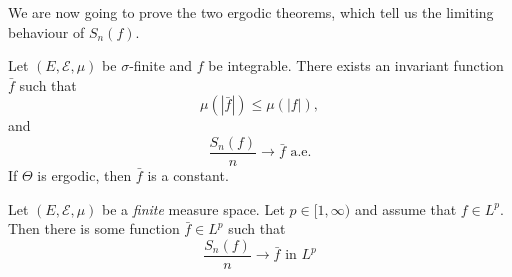 \documentclass[a4paper]{article}
\begin{document}
We are now going to prove the two ergodic theorems, which tell us the limiting behaviour of $S_n(f)$.

\begin{thm}
  Let $(E, \mathcal{E}, \mu)$ be $\sigma$-finite and $f$ be integrable. There exists an invariant function $\bar{f}$ such that
  \[
    \mu(|\bar{f}|) \leq \mu(|f|),
  \]
  and
  \[
    \frac{S_n(f)}{n} \to \bar{f}\text{ a.e.}
  \]
  If $\Theta$ is ergodic, then $\bar{f}$ is a constant.
\end{thm}

\begin{thm}
  Let $(E, \mathcal{E}, \mu)$ be a \emph{finite} measure space. Let $p \in [1, \infty)$ and assume that $f \in L^p$. Then there is some function $\bar{f} \in L^p$ such that
  \[
    \frac{S_n(f)}{n} \to \bar{f}\text{ in $L^p$}
  \]
\end{thm}
\end{document}
